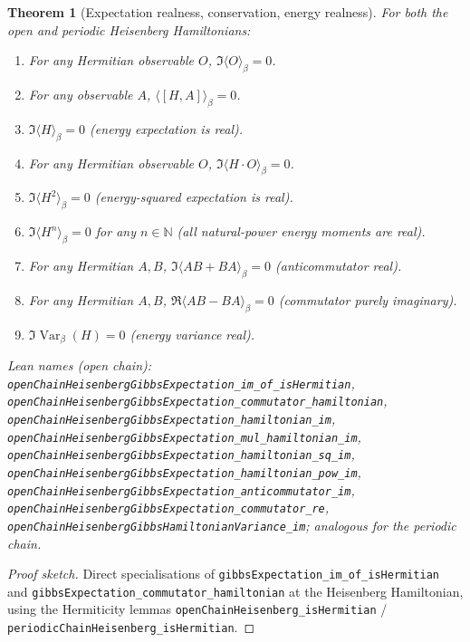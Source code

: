 \documentclass[a4paper,11pt]{article}
\newtheorem{theorem}{Theorem}
\begin{document}
\begin{theorem}[Expectation realness, conservation, energy realness]
For both the open and periodic Heisenberg Hamiltonians:
\begin{enumerate}
  \item For any Hermitian observable $O$,
    $\Im\langle O \rangle_\beta = 0$.
  \item For any observable $A$, $\langle [H, A] \rangle_\beta = 0$.
  \item $\Im\langle H \rangle_\beta = 0$ (energy expectation is real).
  \item For any Hermitian observable $O$,
    $\Im\langle H \cdot O \rangle_\beta = 0$.
  \item $\Im\langle H^2 \rangle_\beta = 0$ (energy-squared expectation is real).
  \item $\Im\langle H^n \rangle_\beta = 0$ for any $n \in \mathbb{N}$
    (all natural-power energy moments are real).
  \item For any Hermitian $A, B$,
    $\Im\langle A B + B A \rangle_\beta = 0$ (anticommutator real).
  \item For any Hermitian $A, B$,
    $\Re\langle A B - B A \rangle_\beta = 0$ (commutator purely imaginary).
  \item $\Im\operatorname{Var}_\beta(H) = 0$ (energy variance real).
\end{enumerate}
Lean names (open chain):
\texttt{openChainHeisenbergGibbsExpectation\_im\_of\_isHermitian},
\texttt{openChainHeisenbergGibbsExpectation\_commutator\_hamiltonian},
\texttt{openChainHeisenbergGibbsExpectation\_hamiltonian\_im},
\texttt{openChainHeisenbergGibbsExpectation\_mul\_hamiltonian\_im},
\texttt{openChainHeisenbergGibbsExpectation\_hamiltonian\_sq\_im},
\texttt{openChainHeisenbergGibbsExpectation\_hamiltonian\_pow\_im},
\texttt{openChainHeisenbergGibbsExpectation\_anticommutator\_im},
\texttt{openChainHeisenbergGibbsExpectation\_commutator\_re},
\texttt{openChainHeisenbergGibbsHamiltonianVariance\_im};
analogous for the periodic chain.
\end{theorem}

\begin{proof}[Proof sketch]
Direct specialisations of
\texttt{gibbsExpectation\_im\_of\_isHermitian} and
\texttt{gibbsExpectation\_commutator\_hamiltonian} at the Heisenberg
Hamiltonian, using the Hermiticity lemmas
\texttt{openChainHeisenberg\_isHermitian} /
\texttt{periodicChainHeisenberg\_isHermitian}.
\end{proof}
\end{document}
